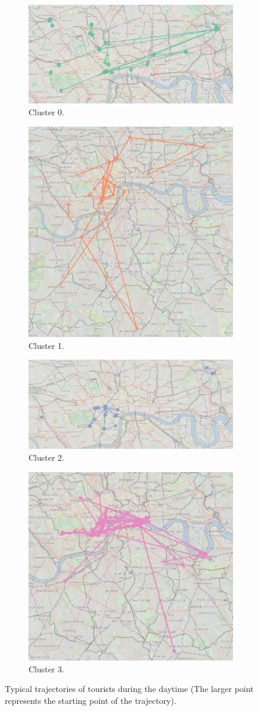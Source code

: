 \documentclass{article}
\theoremstyle{remark}
\begin{document}
\begin{figure}[!h]

\centering
\begin{subfigure}{0.6\textheight}
\centering
\includegraphics[width=0.4\linewidth]{figures/daytime_tourists_c0.png}
\caption{Cluster 0.}
\label{fig:daytime_tourists_c0}
\end{subfigure}
\begin{subfigure}{0.6\textheight}
\centering
\includegraphics[width=0.4\linewidth]{figures/daytime_tourists_c1.png}
\caption{Cluster 1.}
\label{fig:daytime_tourists_c1}
\end{subfigure}
\begin{subfigure}{0.6\textheight}
\centering
\includegraphics[width=0.4\linewidth]{figures/daytime_tourists_c2.png}
\caption{Cluster 2.}
\label{fig:daytime_tourists_c2}
\end{subfigure}
\begin{subfigure}{0.6\textheight}
\centering
\includegraphics[width=0.4\linewidth]{figures/daytime_tourists_c3.png}
\caption{Cluster 3.}
\label{fig:daytime_tourists_c3}
\end{subfigure}

\caption{Typical trajectories of tourists during the daytime (The larger point represents the starting point of the trajectory).}
\label{fig:sequences_daytime_tourists}
\end{figure}
\end{document}
